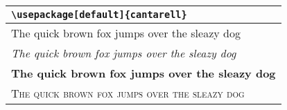 \documentclass[11pt]{article}
\begin{document}
\begin{tabular}{l}
	\verb!\usepackage[default]{cantarell}!\\\hline
	{\fcafamily The quick brown fox jumps over the sleazy dog}\\
	{\fcafamily \slshape The quick brown fox jumps over the sleazy dog}\\
	{\fcafamily \bfseries The quick brown fox jumps over the sleazy dog}\\
	{\fcafamily \scshape The quick brown fox jumps over the sleazy dog}\\
\end{tabular}
\end{document}
